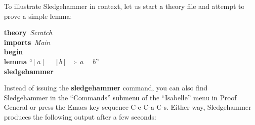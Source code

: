 \documentclass[a4paper,12pt]{article}
\begin{document}
To illustrate Sledgehammer in context, let us start a theory file and
attempt to prove a simple lemma:

\prew
\textbf{theory}~\textit{Scratch} \\
\textbf{imports}~\textit{Main} \\
\textbf{begin} \\[2\smallskipamount]
%
\textbf{lemma} ``$[a] = [b] \,\Longrightarrow\, a = b$'' \\
\textbf{sledgehammer}
\postw

Instead of issuing the \textbf{sledgehammer} command, you can also find
Sledgehammer in the ``Commands'' submenu of the ``Isabelle'' menu in Proof
General or press the Emacs key sequence C-c C-a C-s.
Either way, Sledgehammer produces the following output after a few seconds:
\end{document}
